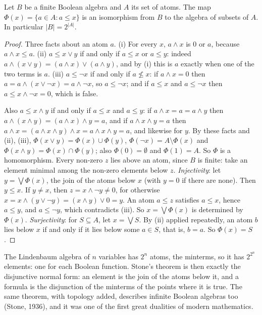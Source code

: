 \begin{theorem}\label{thm:stone}
Let $B$ be a finite Boolean algebra and $A$ its set of atoms. The map $\Phi(x)=\{a\in A:a\le x\}$ is an isomorphism from $B$ to
the algebra of subsets of $A$. In particular $|B|=2^{|A|}$.
\end{theorem}
\begin{proof}
Three facts about an atom $a$. (i) For every $x$, $a\land x$ is $0$ or $a$, because $a\land x\le a$. (ii) $a\le x\lor y$ if and only if
$a\le x$ or $a\le y$: indeed $a\land(x\lor y)=(a\land x)\lor(a\land y)$, and by (i) this is $a$ exactly when one of the two terms is $a$.
(iii) $a\le\neg x$ if and only if $a\not\le x$: if $a\land x=0$ then $a=a\land(x\lor\neg x)=a\land\neg x$, so $a\le\neg x$; and if $a\le x$ and $a\le\neg x$
then $a\le x\land\neg x=0$, which is false.

Also $a\le x\land y$ if and only if $a\le x$ and $a\le y$: if $a\land x=a=a\land y$ then $a\land(x\land y)=(a\land x)\land y=a$, and if
$a\land x\land y=a$ then $a\land x=(a\land x\land y)\land x=a\land x\land y=a$, and likewise for $y$. By these facts and (ii), (iii), $\Phi(x\lor y)=\Phi(x)\cup\Phi(y)$, $\Phi(\neg x)=A\setminus\Phi(x)$ and $\Phi(x\land y)=\Phi(x)\cap\Phi(y)$; also
$\Phi(0)=\emptyset$ and $\Phi(1)=A$. So $\Phi$ is a homomorphism. Every non-zero $z$ lies above an atom, since $B$ is finite: take an
element minimal among the non-zero elements below $z$. \emph{Injectivity}: let $y=\bigvee\Phi(x)$, the join of the atoms below $x$ (with
$y=0$ if there are none). Then $y\le x$. If $y\ne x$, then $z=x\land\neg y\ne0$, for otherwise $x=x\land(y\lor\neg y)=(x\land y)\lor0=y$. An atom $a\le z$
satisfies $a\le x$, hence $a\le y$, and $a\le\neg y$, which contradicts (iii). So $x=\bigvee\Phi(x)$ is determined by $\Phi(x)$.
\emph{Surjectivity}: for $S\subseteq A$, let $x=\bigvee S$. By (ii) applied repeatedly, an atom $b$ lies below $x$ if and only if it lies
below some $a\in S$, that is, $b=a$. So $\Phi(x)=S$.
\end{proof}

\begin{beauty}
The Lindenbaum algebra of $n$ variables has $2^n$ atoms, the minterms, so it has $2^{2^n}$ elements: one for each Boolean
function. Stone's theorem is then exactly the disjunctive normal form: an element is the join of the atoms below it,
and a formula is the disjunction of the minterms of the points where it is true. The same theorem, with
topology added, describes infinite Boolean algebras too (Stone, 1936), and it was one of the first great
dualities of modern mathematics.
\end{beauty}

